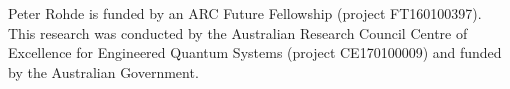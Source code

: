 \begin{acknowledgements}
Peter Rohde is funded by an ARC Future Fellowship (project FT160100397). This research was conducted by the Australian Research Council Centre of Excellence for Engineered Quantum Systems (project CE170100009) and funded by the Australian Government.
\end{acknowledgements}
